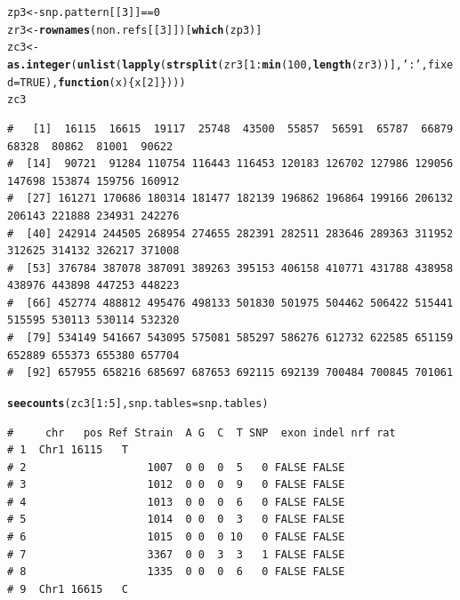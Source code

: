 \documentclass{article}\usepackage[]{graphicx}\usepackage[]{color}
\makeatletter
\newcommand{\hlnum}[1]{\textcolor[rgb]{0.686,0.059,0.569}{#1}}%
\newcommand{\hlstr}[1]{\textcolor[rgb]{0.192,0.494,0.8}{#1}}%
\newcommand{\hlopt}[1]{\textcolor[rgb]{0,0,0}{#1}}%
\newcommand{\hlstd}[1]{\textcolor[rgb]{0.345,0.345,0.345}{#1}}%
\newcommand{\hlkwa}[1]{\textcolor[rgb]{0.161,0.373,0.58}{\textbf{#1}}}%
\newcommand{\hlkwb}[1]{\textcolor[rgb]{0.69,0.353,0.396}{#1}}%
\newcommand{\hlkwc}[1]{\textcolor[rgb]{0.333,0.667,0.333}{#1}}%
\newcommand{\hlkwd}[1]{\textcolor[rgb]{0.737,0.353,0.396}{\textbf{#1}}}%
\newenvironment{kframe}{%
 \def\at@end@of@kframe{}%
 \ifinner\ifhmode%
  \def\at@end@of@kframe{\end{minipage}}%
  \begin{minipage}{\columnwidth}%
 \fi\fi%
 \def\FrameCommand##1{\hskip\@totalleftmargin \hskip-\fboxsep
 \colorbox{shadecolor}{##1}\hskip-\fboxsep
     \hskip-\linewidth \hskip-\@totalleftmargin \hskip\columnwidth}%
 \MakeFramed {\advance\hsize-\width
   \@totalleftmargin\z@ \linewidth\hsize
   \@setminipage}}%
 {\par\unskip\endMakeFramed%
 \at@end@of@kframe}
\newenvironment{knitrout}{}{} %
\makeatother
\begin{document}
\begin{knitrout}\footnotesize
{}\color{fgcolor}\begin{kframe}
\begin{alltt}
\hlstd{zp3} \hlkwb{<-} \hlstd{snp.pattern[[}\hlnum{3}\hlstd{]]} \hlopt{==} \hlnum{0}
\hlstd{zr3} \hlkwb{<-} \hlkwd{rownames}\hlstd{(non.refs[[}\hlnum{3}\hlstd{]])[}\hlkwd{which}\hlstd{(zp3)]}
\hlstd{zc3} \hlkwb{<-} \hlkwd{as.integer}\hlstd{(}\hlkwd{unlist}\hlstd{(}\hlkwd{lapply}\hlstd{(}\hlkwd{strsplit}\hlstd{(zr3[}\hlnum{1}\hlopt{:}\hlkwd{min}\hlstd{(}\hlnum{100}\hlstd{,}\hlkwd{length}\hlstd{(zr3))],}\hlstr{':'}\hlstd{,}\hlkwc{fixed}\hlstd{=}\hlnum{TRUE}\hlstd{),}\hlkwa{function}\hlstd{(}\hlkwc{x}\hlstd{)\{x[}\hlnum{2}\hlstd{]\})))}
\hlstd{zc3}
\end{alltt}
\begin{verbatim}
#   [1]  16115  16615  19117  25748  43500  55857  56591  65787  66879  68328  80862  81001  90622
#  [14]  90721  91284 110754 116443 116453 120183 126702 127986 129056 147698 153874 159756 160912
#  [27] 161271 170686 180314 181477 182139 196862 196864 199166 206132 206143 221888 234931 242276
#  [40] 242914 244505 268954 274655 282391 282511 283646 289363 311952 312625 314132 326217 371008
#  [53] 376784 387078 387091 389263 395153 406158 410771 431788 438958 438976 443898 447253 448223
#  [66] 452774 488812 495476 498133 501830 501975 504462 506422 515441 515595 530113 530114 532320
#  [79] 534149 541667 543095 575081 585297 586276 612732 622585 651159 652889 655373 655380 657704
#  [92] 657955 658216 685697 687653 692115 692139 700484 700845 701061
\end{verbatim}
\begin{alltt}
\hlkwd{seecounts}\hlstd{(zc3[}\hlnum{1}\hlopt{:}\hlnum{5}\hlstd{],} \hlkwc{snp.tables}\hlstd{=snp.tables)}
\end{alltt}
\begin{verbatim}
#     chr   pos Ref Strain  A G  C  T SNP  exon indel nrf rat
# 1  Chr1 16115   T                                          
# 2                   1007  0 0  0  5   0 FALSE FALSE        
# 3                   1012  0 0  0  9   0 FALSE FALSE        
# 4                   1013  0 0  0  6   0 FALSE FALSE        
# 5                   1014  0 0  0  3   0 FALSE FALSE        
# 6                   1015  0 0  0 10   0 FALSE FALSE        
# 7                   3367  0 0  3  3   1 FALSE FALSE        
# 8                   1335  0 0  0  6   0 FALSE FALSE        
# 9  Chr1 16615   C                                          

\end{verbatim}
\end{kframe}
\end{knitrout}
\end{document}
